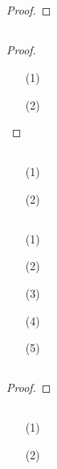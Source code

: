 \documentclass[UTF8]{ctexart}
\begin{document}
\subsection{}   %
\begin{proof}
    
\end{proof}

\subsection{}   %
\begin{proof}
    \begin{enumerate}
        \item []
        \item [(1)]
        \item [(2)]
    \end{enumerate}
\end{proof}

\subsection{}   %
\begin{enumerate}
    \item [(1)]
    \item [(2)]
\end{enumerate}

\subsection{}   %
\begin{enumerate}
    \item [(1)]
    \item [(2)]
    \item [(3)]
    \item [(4)]
    \item [(5)]
\end{enumerate}

\subsection{}   %
\begin{proof}
    
\end{proof}

\subsection{}   %
\begin{enumerate}
    \item [(1)]
    \item [(2)]
\end{enumerate}
\end{document}
